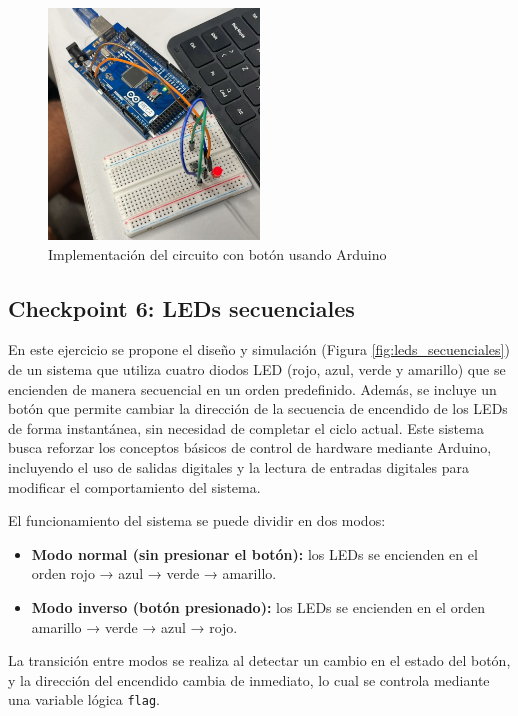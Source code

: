 \documentclass{article}
\begin{document}
\begin{figure}[H]
    \centering
    \includegraphics[width=0.50\textwidth]{./img/ckpt_3_5_1.png}
    \caption{Implementación del circuito con botón usando Arduino}
    \label{fig:simulacion_esquema8}
\end{figure}

\subsection{Checkpoint 6: LEDs secuenciales}

En este ejercicio se propone el dise\~no y simulación (Figura \ref{fig:leds_secuenciales}) de un sistema que utiliza cuatro diodos LED (rojo, azul, verde y amarillo) que se encienden de manera secuencial en un orden predefinido. Adem\'as, se incluye un botón que permite cambiar la dirección de la secuencia de encendido de los LEDs de forma instant\'anea, sin necesidad de completar el ciclo actual. Este sistema busca reforzar los conceptos b\'asicos de control de hardware mediante Arduino, incluyendo el uso de salidas digitales y la lectura de entradas digitales para modificar el comportamiento del sistema.

El funcionamiento del sistema se puede dividir en dos modos: 
\begin{itemize}
    \item \textbf{Modo normal (sin presionar el botón):} los LEDs se encienden en el orden rojo → azul → verde → amarillo.
    \item \textbf{Modo inverso (botón presionado):} los LEDs se encienden en el orden amarillo → verde → azul → rojo.
\end{itemize}

La transición entre modos se realiza al detectar un cambio en el estado del botón, y la dirección del encendido cambia de inmediato, lo cual se controla mediante una variable lógica \texttt{flag}.
\end{document}
